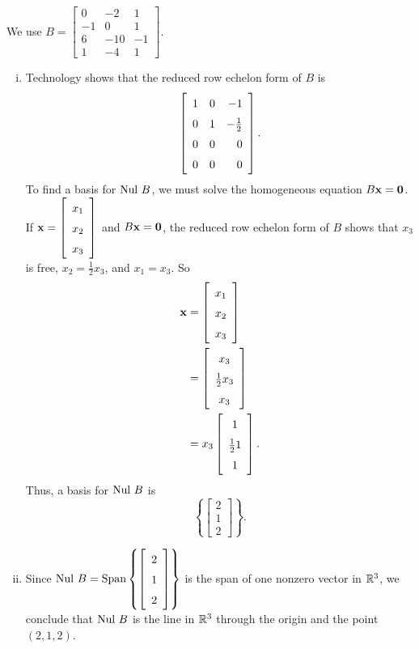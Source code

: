 \begin{example}
\item We use $B = \left[ \begin{array}{rrr} 0&-2&1\\-1&0&1 \\ 6&-10&-1 \\ 1&-4&1  \end{array} \right]$.
	\begin{enumerate}[i.]
	\item Technology shows that the reduced row echelon form of $B$ is 
	\[\left[ \renewcommand{\arraystretch}{1.5} \begin {array}{ccr} 1&0&-1\\ 0&1&-\frac{1}{2} \\ 0&0&0 \\ 0&0&0\end {array} \right].\]
	To find a basis for $\text{Nul } B$, we must solve the homogeneous equation $B \mathbf{x} = \mathbf{0}$. If $\vx = \left[ \begin{array}{c}x_1\\x_2\\x_3 \end{array} \right]$ and $B \mathbf{x} = \mathbf{0}$, the reduced row echelon form of $B$ shows that $x_3$ is free, $x_2 = \frac{1}{2}x_3$, and $x_1 = x_3$. So 
	\begin{align*}
	\vx &= \left[ \begin{array}{c}x_1\\x_2\\x_3 \end{array} \right] \\
		&= \left[ \renewcommand{\arraystretch}{1.5} \begin{array}{c}x_3\\ \frac{1}{2}x_3 \\x_3 \end{array} \right] \\
		&= x_3\left[ \renewcommand{\arraystretch}{1.5} \begin{array}{c}1\\ \frac{1}{2}1\\1 \end{array} \right] .
	\end{align*}
	 Thus, a basis for $\text{Nul } B$ is 
	\[\left\{ \left[ \begin {array}{c} 2\\ 1 \\ 2\end {array} \right] \right\}.\]

	\item  Since $\Nul B = \Span\left\{ \left[ \begin {array}{c} 2\\ 1 \\ 2\end {array} \right] \right\}$ is the span of one nonzero vector in $\mathbb{R}^3$, we conclude that $\text{Nul } B$ is the line in $\mathbb{R}^3$ through the origin and the point $(2,1,2)$.
	\end{enumerate}
	
\ea


\end{example}


